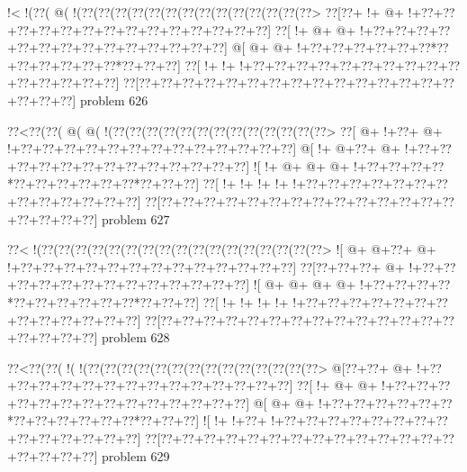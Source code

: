 \vbox{\vbox{\goo
\- !<\- !(\0??(\- @(\- !(\0??(\0??(\0??(\0??(\0??(\0??(\0??(\0??(\0??(\0??(\0??(\0??(\0??(\0??>
\0??[\0??+\- !+\- @+\- !+\0??+\0??+\0??+\0??+\0??+\0??+\0??+\0??+\0??+\0??+\0??+\0??+\0??+\0??]
\0??[\- !+\- @+\- @+\- !+\0??+\0??+\0??+\0??+\0??+\0??+\0??+\0??+\0??+\0??+\0??+\0??+\0??+\0??]
\- @[\- @+\- @+\- !+\0??+\0??+\0??+\0??+\0??+\0??*\0??+\0??+\0??+\0??+\0??+\0??*\0??+\0??+\0??]
\0??[\- !+\- !+\- !+\0??+\0??+\0??+\0??+\0??+\0??+\0??+\0??+\0??+\0??+\0??+\0??+\0??+\0??+\0??]
\0??[\0??+\0??+\0??+\0??+\0??+\0??+\0??+\0??+\0??+\0??+\0??+\0??+\0??+\0??+\0??+\0??+\0??+\0??]
}
\hfil problem 626\hfil\break
}



\vbox{\vbox{\goo
\0??<\0??(\0??(\- @(\- @(\- !(\0??(\0??(\0??(\0??(\0??(\0??(\0??(\0??(\0??(\0??(\0??(\0??(\0??>
\0??[\- @+\- !+\0??+\- @+\- !+\0??+\0??+\0??+\0??+\0??+\0??+\0??+\0??+\0??+\0??+\0??+\0??+\0??]
\- @[\- !+\- @+\0??+\- @+\- !+\0??+\0??+\0??+\0??+\0??+\0??+\0??+\0??+\0??+\0??+\0??+\0??+\0??]
\- ![\- !+\- @+\- @+\- @+\- !+\0??+\0??+\0??+\0??*\0??+\0??+\0??+\0??+\0??+\0??*\0??+\0??+\0??]
\0??[\- !+\- !+\- !+\- !+\- !+\0??+\0??+\0??+\0??+\0??+\0??+\0??+\0??+\0??+\0??+\0??+\0??+\0??]
\0??[\0??+\0??+\0??+\0??+\0??+\0??+\0??+\0??+\0??+\0??+\0??+\0??+\0??+\0??+\0??+\0??+\0??+\0??]
}
\hfil problem 627\hfil\break
}



\vbox{\vbox{\goo
\0??<\- !(\0??(\0??(\0??(\0??(\0??(\0??(\0??(\0??(\0??(\0??(\0??(\0??(\0??(\0??(\0??(\0??(\0??>
\- ![\- @+\- @+\0??+\- @+\- !+\0??+\0??+\0??+\0??+\0??+\0??+\0??+\0??+\0??+\0??+\0??+\0??+\0??]
\0??[\0??+\0??+\0??+\- @+\- !+\0??+\0??+\0??+\0??+\0??+\0??+\0??+\0??+\0??+\0??+\0??+\0??+\0??]
\- ![\- @+\- @+\- @+\- @+\- !+\0??+\0??+\0??+\0??*\0??+\0??+\0??+\0??+\0??+\0??*\0??+\0??+\0??]
\0??[\- !+\- !+\- !+\- !+\- !+\0??+\0??+\0??+\0??+\0??+\0??+\0??+\0??+\0??+\0??+\0??+\0??+\0??]
\0??[\0??+\0??+\0??+\0??+\0??+\0??+\0??+\0??+\0??+\0??+\0??+\0??+\0??+\0??+\0??+\0??+\0??+\0??]
}
\hfil problem 628\hfil\break
}



\vbox{\vbox{\goo
\0??<\0??(\0??(\- !(\- !(\0??(\0??(\0??(\0??(\0??(\0??(\0??(\0??(\0??(\0??(\0??(\0??(\0??(\0??>
\- @[\0??+\0??+\- @+\- !+\0??+\0??+\0??+\0??+\0??+\0??+\0??+\0??+\0??+\0??+\0??+\0??+\0??+\0??]
\0??[\- !+\- @+\- @+\- !+\0??+\0??+\0??+\0??+\0??+\0??+\0??+\0??+\0??+\0??+\0??+\0??+\0??+\0??]
\- @[\- @+\- @+\- !+\0??+\0??+\0??+\0??+\0??+\0??*\0??+\0??+\0??+\0??+\0??+\0??*\0??+\0??+\0??]
\- ![\- !+\- !+\0??+\- !+\0??+\0??+\0??+\0??+\0??+\0??+\0??+\0??+\0??+\0??+\0??+\0??+\0??+\0??]
\0??[\0??+\0??+\0??+\0??+\0??+\0??+\0??+\0??+\0??+\0??+\0??+\0??+\0??+\0??+\0??+\0??+\0??+\0??]
}
\hfil problem 629\hfil\break
}



